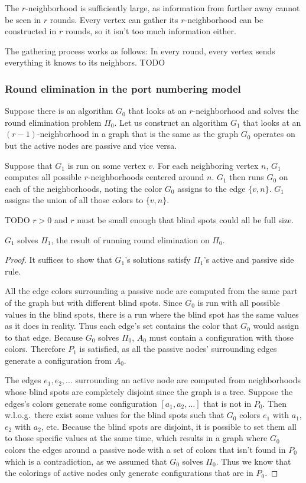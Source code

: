 \documentclass[english, 12pt, a4paper, sci, a-1b, online]{aaltothesis}
\begin{document}
The $r$-neighborhood is sufficiently large, as information from further away cannot be seen in $r$ rounds. Every vertex can gather its $r$-neighborhood can be constructed in $r$ rounds, so it isn't too much information either.

The gathering process works as follows: In every round, every vertex sends everything it knows to its neighbors. TODO

\subsubsection{Round elimination in the port numbering model}

Suppose there is an algorithm $G_0$ that looks at an $r$-neighborhood and solves the round elimination problem $\Pi_0$. Let us construct an algorithm $G_1$ that looks at an $(r-1)$-neighborhood in a graph that is the same as the graph $G_0$ operates on but the active nodes are passive and vice versa.

Suppose that $G_1$ is run on some vertex $v$. For each neighboring vertex $n$, $G_1$ computes all possible $r$-neighborhoods centered around $n$. $G_1$ then runs $G_0$ on each of the neighborhoods, noting the color $G_0$ assigns to the edge $\{v, n\}$. $G_1$ assigns the union of all those colors to $\{v, n\}$.

TODO $r > 0$ and $r$ must be small enough that blind spots could all be full size.

\begin{lemma}
  $G_1$ solves $\Pi_1$, the result of running round elimination on $\Pi_0$.
\end{lemma}
\begin{proof}
  It suffices to show that $G_1$'s solutions satisfy $\Pi_1$'s active and passive side rule.

  All the edge colors surrounding a passive node are computed from the same part of the graph but with different blind spots. Since $G_0$ is run  with all possible values in the blind spots, there is a run where the blind spot has the same values as it does in reality. Thus each edge's set contains the color that $G_0$ would assign to that edge. Because $G_0$ solves $\Pi_0$, $A_0$ must contain a configuration with those colors. Therefore $P_1$ is satisfied, as all the passive nodes' surrounding edges generate a configuration from $A_0$.

  The edges $e_1, e_2, \ldots$ surrounding an active node are computed from neighborhoods whose blind spots are completely disjoint since the graph is a tree. Suppose the edges's colors generate some configuration $[a_1, a_2, \ldots]$ that is not in $P_0$. Then w.l.o.g.\ there exist some values for the blind spots such that $G_0$ colors $e_1$ with $a_1$, $e_2$ with $a_2$, etc. Because the blind spots are disjoint, it is possible to set them all to those specific values at the same time, which results in a graph where $G_0$ colors the edges around a passive node with a set of colors that isn't found in $P_0$ which is a contradiction, as we assumed that $G_0$ solves $\Pi_0$. Thus we know that the colorings of active nodes only generate configurations that are in $P_0$.
\end{proof}
\end{document}
